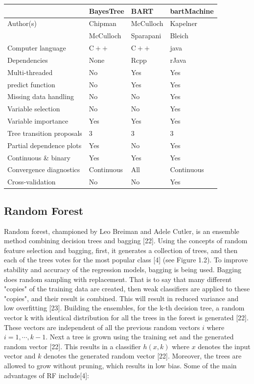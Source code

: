 \documentclass{usiinftr}
\begin{document}
\begin{table}[h!]
\centering
\begin{tabular}{l|lll} 
& BayesTree & BART & bartMachine \\
\hline Author(s) & Chipman & McCulloch & Kapelner \\
& McCulloch & Sparapani & Bleich \\
Computer language & $\mathrm{C}++$ & $\mathrm{C}++$ & java \\
Dependencies & None & Rcpp & rJava \\
Multi-threaded & No & Yes & Yes \\
predict function & No & Yes & Yes \\
Missing data handling & No & No & Yes \\
Variable selection & No & No & Yes \\
Variable importance & Yes & Yes & Yes \\
Tree transition proposals & 3 & 3 & 3 \\
Partial dependence plots & Yes & No & Yes \\
Continuous \& binary & Yes & Yes & Yes \\
Convergence diagnostics & Continuous & All & Continuous \\
Cross-validation & No & No & Yes \\
\hline
\end{tabular}
\end{table}

\subsection{Random Forest}
Random forest, championed by Leo Breiman and Adele Cutler, is an ensemble method combining decision trees and bagging [22]. Using the concepts of random feature selection and bagging, first, it generates a collection of trees, and then each of the trees votes for the most popular class [4] (see Figure 1.2). To improve stability and accuracy of the regression models, bagging is being used. Bagging does random sampling with replacement. That is to say that  many different "copies" of the training data are created, then weak classifiers are applied to these "copies", and their result is combined. This will result in reduced variance and low overfitting [23]. 
	Building the ensembles, for the k-th decision tree, a random vector k with identical distribution for all the trees in the forest is generated [22]. These vectors are independent of all the previous random vectors $i$ where $i = 1,\cdots,k-1$. Next a tree is grown using the training set and the generated random vector [22]. This results in a classifier $h(x,k)$ where $x$ denotes the input vector and $k$ denotes the generated random vector [22]. Moreover, the trees are allowed to grow without pruning, which results in low bias.  Some of the main advantages of RF include[4]:
\end{document}
